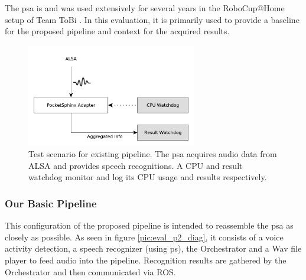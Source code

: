 The \gls{psa} is and was used extensively for several years in the RoboCup@Home setup of Team ToBi \cite{ToBi}.
In this evaluation, it is primarily used to provide a baseline for the proposed pipeline and context for the acquired results.

\begin{figure}[]
	\centering
	\includegraphics[width=0.66\textwidth]{diagrams/eval_pipeline_1.pdf}
	\caption{Test scenario for existing pipeline.
		The \gls{psa} acquires audio data from ALSA and provides speech recognitions.
		A CPU and result watchdog monitor and log its CPU usage and results respectively.}
	\label{pic:eval_p1_diag}
\end{figure}

\subsubsection{Our Basic Pipeline}
\label{eval:dataset:pipeline:baseline}
This configuration of the proposed pipeline is intended to reassemble the \gls{psa} as closely as possible.
As seen in figure \ref{pic:eval_p2_diag}, it consists of a voice activity detection, a speech recognizer (using \gls{ps}), the Orchestrator and a Wav file player to feed audio into the pipeline.
Recognition results are gathered by the Orchestrator and then communicated via ROS.

